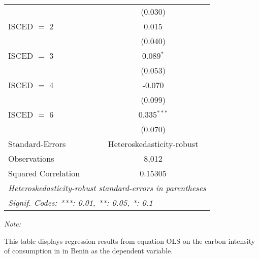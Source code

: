 \begin{table}[htbp!]
\begin{adjustbox}{width = 1\textwidth, max height = 0.95\textheight, center}
\begin{threeparttable}[b]
\begin{tabular}{lc}
                                & (0.030)\\   
            ISCED $=$ 2         & 0.015\\   
                                & (0.040)\\   
            ISCED $=$ 3         & 0.089$^{*}$\\   
                                & (0.053)\\   
            ISCED $=$ 4         & -0.070\\   
                                & (0.099)\\   
            ISCED $=$ 6         & 0.335$^{***}$\\   
                                & (0.070)\\   
            \midrule 
            Standard-Errors     & Heteroskedasticity-robust \\   
            Observations        & 8,012\\  
            Squared Correlation & 0.15305\\  
            \midrule \midrule
            \multicolumn{2}{l}{\emph{Heteroskedasticity-robust standard-errors in parentheses}}\\
            \multicolumn{2}{l}{\emph{Signif. Codes: ***: 0.01, **: 0.05, *: 0.1}}\\
         \end{tabular}
         
         \begin{tablenotes}\item \medskip \textit{Note:}
            \item This table displays regression results from equation OLS on the carbon intensity of consumption in  in Benin as the dependent variable. 
         \end{tablenotes}
      \end{threeparttable}
   \end{adjustbox}
\end{table}


